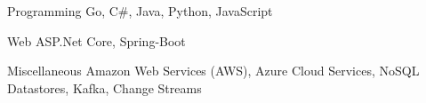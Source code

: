 

\begin{cvskills}

  \cvskill
    {Programming} %
    {Go, C\#, Java, Python, JavaScript} %


  \cvskill
    {Web} %
    {ASP.Net Core, Spring-Boot} %

  \cvskill
    {Miscellaneous} %
    {Amazon Web Services (AWS), Azure Cloud Services, NoSQL Datastores, Kafka, Change Streams} %

\end{cvskills}

